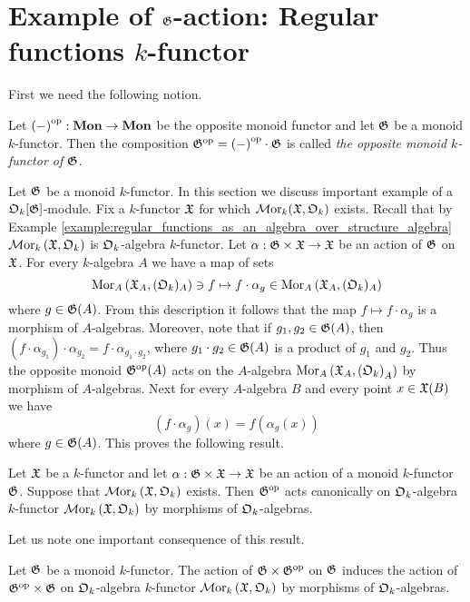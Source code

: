 \section{Example of ${\mathfrak G}$-action: Regular functions $k$-functor}
\noindent
First we need the following notion.

\begin{definition}
Let $\left(-\right)^{\mathrm{op}}:\mathbf{Mon} \rightarrow \mathbf{Mon}$ be the opposite monoid functor and let ${\mathfrak G}$ be a monoid $k$-functor. Then the composition ${\mathfrak G}^{\mathrm{op}} = \left(-\right)^{\mathrm{op}}\cdot {\mathfrak G}$ is called \textit{the opposite monoid $k$-functor of ${\mathfrak G}$}.
\end{definition}
\noindent
Let ${\mathfrak G}$ be a monoid $k$-functor. In this section we discuss important example of a ${\mathfrak O}_k[{\mathfrak G}]$-module. Fix a $k$-functor ${\mathfrak X}$ for which $\mathcal{M}\mathrm{or}_k({\mathfrak X},{\mathfrak O}_k)$ exists. Recall that by Example \ref{example:regular_functions_as_an_algebra_over_structure_algebra} $\mathcal{M}\mathrm{or}_k\left({\mathfrak X},{\mathfrak O}_k\right)$ is ${\mathfrak O}_k$-algebra $k$-functor. Let $\alpha:{\mathfrak G}\times {\mathfrak X}\rightarrow {\mathfrak X}$ be an action of ${\mathfrak G}$ on ${\mathfrak X}$. For every $k$-algebra $A$ we have a map of sets
$$\mathrm{Mor}_A\left({\mathfrak X}_A,({\mathfrak O}_k)_A\right) \ni f\mapsto f\cdot \alpha_{g}\in \mathrm{Mor}_A\left({\mathfrak X}_A,({\mathfrak O}_k)_A\right)$$
where $g\in {\mathfrak G}(A)$. From this description it follows that the map $f\mapsto f\cdot \alpha_{g}$ is a morphism of $A$-algebras. Moreover, note that if $g_1,g_2\in {\mathfrak G}(A)$, then $\left(f\cdot \alpha_{g_1}\right)\cdot \alpha_{g_2} = f\cdot \alpha_{g_1\cdot g_2}$, where $g_1\cdot g_2 \in {\mathfrak G}(A)$ is a product of $g_1$ and $g_2$. Thus the opposite monoid ${\mathfrak G}^{\mathrm{op}}(A)$ acts on the $A$-algebra $\mathrm{Mor}_A\left({\mathfrak X}_A,\left({\mathfrak O}_k\right)_A\right)$ by morphism of $A$-algebras. Next for every $A$-algebra $B$ and every point $x\in {\mathfrak X}(B)$ we have
$$(f\cdot \alpha_{g})(x) = f\left(\alpha_{g}(x)\right)$$
where $g\in {\mathfrak G}(A)$. This proves the following result.

\begin{proposition}\label{proposition:action_on_regular_k_functor}
Let ${\mathfrak X}$ be a $k$-functor and let $\alpha:{\mathfrak G}\times {\mathfrak X} \rightarrow {\mathfrak X}$ be an action of a monoid $k$-functor ${\mathfrak G}$. Suppose that $\mathcal{M}\mathrm{or}_k\left({\mathfrak X},{\mathfrak O}_k\right)$ exists. Then ${\mathfrak G}^{\mathrm{op}}$ acts canonically on ${\mathfrak O}_k$-algebra $k$-functor $\mathcal{M}\mathrm{or}_k\left({\mathfrak X},{\mathfrak O}_k\right)$ by morphisms of ${\mathfrak O}_k$-algebras.
\end{proposition}
\noindent
Let us note one important consequence of this result.

\begin{corollary}\label{corollary:action_on_regular_k_functor}
Let ${\mathfrak G}$ be a monoid $k$-functor. The action of ${\mathfrak G}\times {\mathfrak G}^{\mathrm{op}}$ on ${\mathfrak G}$ induces the action of ${\mathfrak G}^{\mathrm{op}}\times {\mathfrak G}$ on ${\mathfrak O}_k$-algebra $k$-functor $\mathcal{M}\mathrm{or}_k\left({\mathfrak X},{\mathfrak O}_k\right)$ by morphisms of ${\mathfrak O}_k$-algebras.
\end{corollary}

